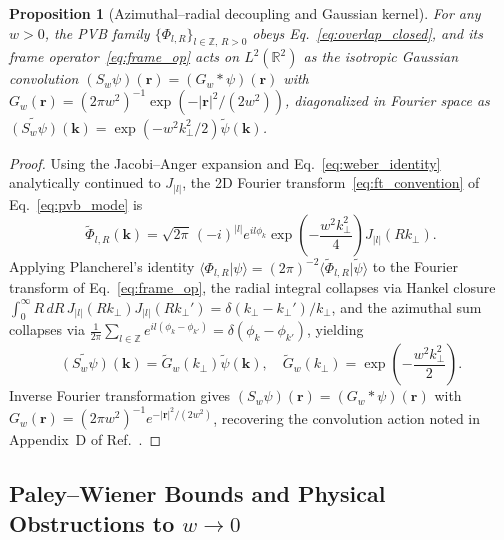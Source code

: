 \documentclass[aps,pra,reprint,amsmath,amssymb,floatfix,longbibliography]{revtex4-2}
\providecommand{\braket}[2]{\langle#1\vert#2\rangle}
\providecommand{\abs}[1]{\lvert#1\rvert}
\newtheorem{proposition}{Proposition}
\begin{document}
\begin{proposition}[Azimuthal--radial decoupling and Gaussian kernel]
\label{prop:conv_kernel}
For any $w > 0$, the PVB family $\{\Phi_{l,R}\}_{l\in\mathbb{Z},\,R>0}$ obeys Eq.~\eqref{eq:overlap_closed}, and its frame operator~\eqref{eq:frame_op} acts on $L^2(\mathbb{R}^2)$ as the isotropic Gaussian convolution $(S_w\psi)(\mathbf{r}) = (G_w * \psi)(\mathbf{r})$ with $G_w(\mathbf{r}) = (2\pi w^2)^{-1}\exp(-\abs{\mathbf{r}}^2/(2w^2))$, diagonalized in Fourier space as $\widetilde{(S_w\psi)}(\mathbf{k}) = \exp(-w^2 k_\perp^2/2)\widetilde{\psi}(\mathbf{k})$.
\end{proposition}
\begin{proof}
Using the Jacobi--Anger expansion and Eq.~\eqref{eq:weber_identity} analytically continued to $J_{\abs{l}}$, the 2D Fourier transform~\eqref{eq:ft_convention} of Eq.~\eqref{eq:pvb_mode} is
\begin{equation}
\widetilde{\Phi}_{l,R}(\mathbf{k}) = \sqrt{2\pi}\,(-i)^{\abs{l}} e^{il\phi_k} \exp\!\left(-\frac{w^2 k_\perp^2}{4}\right) J_{\abs{l}}(R k_\perp).
\label{eq:pvb_ft}
\end{equation}
Applying Plancherel's identity $\braket{\Phi_{l,R}}{\psi} = (2\pi)^{-2}\braket{\widetilde{\Phi}_{l,R}}{\widetilde{\psi}}$ to the Fourier transform of Eq.~\eqref{eq:frame_op}, the radial integral collapses via Hankel closure $\int_0^\infty R\,dR\,J_{\abs{l}}(Rk_\perp)J_{\abs{l}}(Rk_\perp') = \delta(k_\perp - k_\perp')/k_\perp$, and the azimuthal sum collapses via $\frac{1}{2\pi}\sum_{l\in\mathbb{Z}} e^{il(\phi_k-\phi_{k'})} = \delta(\phi_k - \phi_{k'})$, yielding
\begin{equation}
\widetilde{(S_w\psi)}(\mathbf{k}) = \widetilde{G}_w(k_\perp)\widetilde{\psi}(\mathbf{k}), \quad \widetilde{G}_w(k_\perp) = \exp\!\left(-\frac{w^2 k_\perp^2}{2}\right).
\label{eq:fourier_diag}
\end{equation}
Inverse Fourier transformation gives $(S_w\psi)(\mathbf{r}) = (G_w * \psi)(\mathbf{r})$ with $G_w(\mathbf{r}) = (2\pi w^2)^{-1}e^{-\abs{\mathbf{r}}^2/(2w^2)}$, recovering the convolution action noted in Appendix~D of Ref.~\cite{Ferreira2026}.
\end{proof}

\subsection{Paley--Wiener Bounds and Physical Obstructions to \texorpdfstring{$w \to 0$}{w -> 0}}
\label{subsec:paley_wiener}
\end{document}
